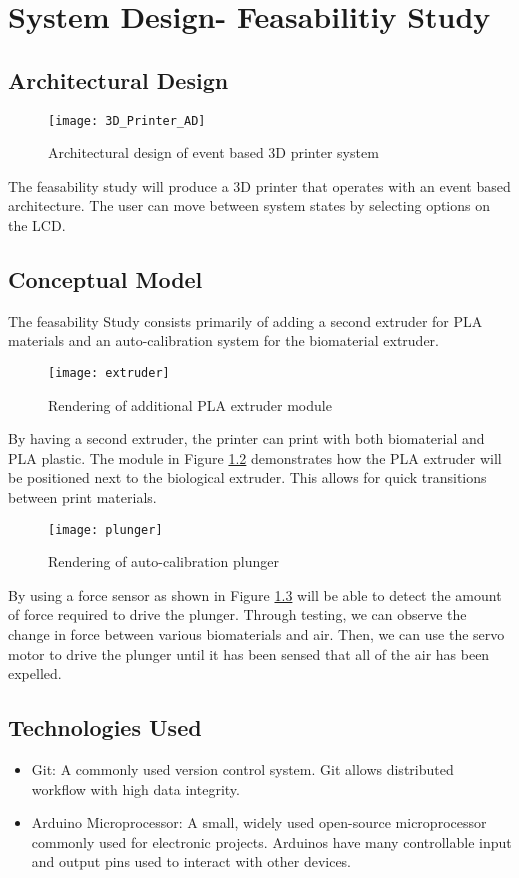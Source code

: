 \chapter{System Design- Feasabilitiy Study}

\section{Architectural Design}
\begin{figure}[H]
\texttt{[image: 3D\_Printer\_AD]}
\caption{\label{figure:3D_Printer_AD} Architectural design of event based 3D printer system}
\end{figure}

The feasability study will produce a 3D printer that operates with an event based architecture. The user can move between system states by selecting options on the LCD.

\section{Conceptual Model}

The feasability Study consists primarily of adding a second extruder for PLA materials and an auto-calibration system for the biomaterial extruder.

\begin{figure}[H]
\texttt{[image: extruder]}
\caption{\label{figure:extruder} Rendering of additional PLA extruder module}
\end{figure}

By having a second extruder, the printer can print with both biomaterial and PLA plastic. The module in Figure \ref{figure:extruder} demonstrates how the PLA extruder will be positioned next to the biological extruder. This allows for quick transitions between print materials. 

\begin{figure}[H]
\texttt{[image: plunger]}
\caption{\label{figure:plunger} Rendering of auto-calibration plunger}
\end{figure}

By using a force sensor as shown in Figure \ref{figure:plunger} will be able to detect the amount of force required to drive the plunger. Through testing, we can observe the change in force between various biomaterials and air. Then, we can use the servo motor to drive the plunger until it has been sensed that all of the air has been expelled. 

\section{Technologies Used}
\begin{itemize}
\item Git: A commonly used version control system. Git allows distributed workflow with high data integrity.
\item Arduino Microprocessor: A small, widely used open-source microprocessor commonly used for electronic projects. Arduinos have many controllable input and output pins used to interact with other devices.
\end{itemize}


